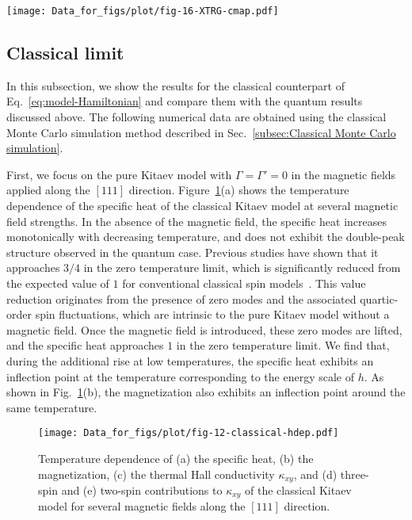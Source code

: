 \documentclass[twocolumn,superscriptaddress,showpacs, longbibliography, aps, prx]{revtex4-2}
\begin{document}
\begin{figure*}[htb]
  \begin{center}
    \texttt{[image: Data\_for\_figs/plot/fig-16-XTRG-cmap.pdf]}
  \end{center}
  \caption{
Color maps of $\kappa_{xy}/T$, corresponding to Fig.~\ref{fig:color_map_C}.} 
  \label{fig:color_map_all}
\end{figure*}

\subsection{Classical limit}
\label{sec:classicalMC}

In this subsection, we show the results for the classical counterpart of Eq.~\eqref{eq:model-Hamiltonian} and compare them with the quantum results discussed above.
The following numerical data are obtained using the classical Monte Carlo simulation method described in Sec.~\ref{subsec:Classical Monte Carlo simulation}. 

First, we focus on the pure Kitaev model with $\Gamma=\Gamma'=0$ in the magnetic fields applied along the $[111]$ direction.
Figure~\ref{fig_classical_hdep}(a) shows the temperature dependence of the specific heat of the classical Kitaev model at several magnetic field strengths. 
In the absence of the magnetic field, the specific heat increases monotonically with decreasing temperature, and does not exhibit the double-peak structure observed in the quantum case. 
Previous studies have shown that it approaches $3/4$ in the zero temperature limit, which is significantly reduced from the expected value of $1$ for conventional classical spin models~\cite{Sela2014,Suzuki2018_2}.
This value reduction originates from the presence of zero modes and the associated quartic-order spin fluctuations, which are intrinsic to the pure Kitaev model without a magnetic field.
Once the magnetic field is introduced, these zero modes are lifted, and the specific heat approaches $1$ in the zero temperature limit. 
We find that, during the additional rise at low temperatures, the specific heat exhibits an inflection point at the temperature corresponding to the energy scale of $h$. 
As shown in Fig.~\ref{fig_classical_hdep}(b), the magnetization also exhibits an inflection point around the same temperature.

\begin{figure}[tbh] 
\begin{center} 
\texttt{[image: Data\_for\_figs/plot/fig-12-classical-hdep.pdf]}
\vspace{-0.5cm} 
\caption{Temperature dependence of (a) the specific heat, (b) the magnetization, (c) the thermal Hall conductivity $\kappa_{xy}$, and (d) three-spin and (e) two-spin contributions to $\kappa_{xy}$ of the classical Kitaev model for several magnetic fields along the $[111]$ direction.}
\label{fig_classical_hdep}
\end{center}
\end{figure}
\end{document}
